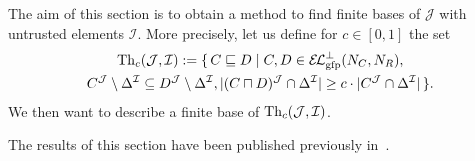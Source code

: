 The aim of this section is to obtain a method to find finite bases of $\mathcal{J}$ with
untrusted elements $\mathcal{I}$.  More precisely, let us define for $c \in [0,1]$ the set
\begin{multline*}
  \Th_{c}(\mathcal{J}, \mathcal{I}) := \{\, C \sqsubseteq D
    \mid C, D \in \ELgfpbot(N_{C}, N_{R}), \\C^{\mathcal{J}} \setminus \Delta^{\mathcal{I}}
    \subseteq D^{\mathcal{J}} \setminus \Delta^{\mathcal{I}}, \abs{ (C \sqcap
      D)^{\mathcal{J}} \cap \Delta^{\mathcal{I}} } \ge c \cdot \abs{ C^{\mathcal{J}} \cap
      \Delta^{\mathcal{I}} } \,\}.
\end{multline*}
We then want to describe a finite base of $\operatorname{Th}_{c}(\mathcal{J}, \mathcal{I})$.

The results of this section have been published previously
in~\cite{conf/dlog/Borchmann13}.

